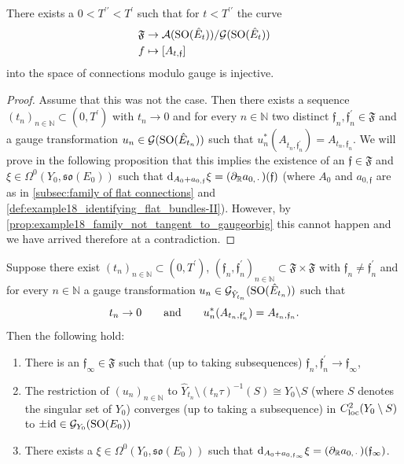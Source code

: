 \documentclass[11pt,a4paper]{scrartcl}
\newcommand*\diff{\mathop{}\!\textup{d}}
\newcommand{\id}{\textup{id}}
\newcommand{\SO}{\textup{SO}}
\numberwithin{equation}{section}
\theoremstyle{plain}
\theoremstyle{definition}
\theoremstyle{remark}
\begin{document}
\begin{proposition}\label{prop:example18-non-gauge-equivalent-instantons}
There exists a $0<T^{\prime\prime}< T^\prime$ such that for $t<T^{\prime\prime}$ the curve 
\begin{align*}
\mathfrak{F} &\to \mathcal{A}(\SO(\hat{E}_t))/\mathcal{G}(\SO(\hat{E}_t)) \\
f &\mapsto [A_{t,\mathfrak{f}}]
\end{align*}
into the space of connections modulo gauge is injective.
\end{proposition}
\begin{proof}
Assume that this was not the case. Then there exists a sequence $(t_n)_{n\in \mathbb{N}} \subset (0,T^\prime)$ with $t_n\to 0$ and for every $n\in \mathbb{N}$ two distinct $\mathfrak{f}_n,\mathfrak{f}_n^\prime \in \mathfrak{F}$ and a gauge transformation $u_n\in \mathcal{G}(\SO(\hat{E}_{t_n}))$ such that $u_n^*(A_{t_n,\mathfrak{f}_n^\prime}) = A_{t_n,\mathfrak{f}_n}$. We will prove in the following proposition that this implies the existence of an $\mathfrak{f} \in \mathfrak{F}$ and $\xi \in \Omega^0(Y_0,\mathfrak{so}(E_0))$ such that $\diff_{A_{0}+a_{0,\mathfrak{f}}} \xi = (\partial_\mathbb{R}a_{0,\, \cdot\, })(\mathfrak{f})$ (where $A_0$ and $a_{0,\mathfrak{f}}$ are as in \autoref{subsec:family of flat connections} and \autoref{def:example18_identifying_flat_bundles-II}). However, by \autoref{prop:example18_family_not_tangent_to_gaugeorbig} this cannot happen and we have arrived therefore at a contradiction.
\end{proof}

\begin{proposition}
Suppose there exist $(t_n)_{n\in \mathbb{N}}\subset (0,T^\prime)$, $(\mathfrak{f}_n,\mathfrak{f}_n^\prime)_{n\in\mathbb{N}}\subset \mathfrak{F}\times \mathfrak{F}$ with $\mathfrak{f}_n \neq \mathfrak{f}_n^\prime$ and for every $n\in \mathbb{N}$ a gauge transformation $u_n \in \mathcal{G}_{\hat{Y}_{t_n}}(\SO(\hat{E}_{t_n}))$ such that \[t_n \to 0 \qquad \textup{and} \qquad u_n^*(A_{t_n,\mathfrak{f}_n^\prime}) = A_{t_n,\mathfrak{f}_n}. \] Then the following hold: 
\begin{enumerate}
\item There is an $\mathfrak{f}_\infty \in \mathfrak{F}$ such that (up to taking subsequences) $\mathfrak{f}_n,\mathfrak{f}_n^\prime \to \mathfrak{f}_\infty$,
\item The restriction of $(u_n)_{n\in \mathbb{N}}$ to $\hat{Y}_{t_n}\setminus (t_n\tau)^{-1}(S) \cong Y_0 \setminus S$ (where $S$ denotes the singular set of $Y_0$) converges (up to taking a subsequence) in $C^2_{\textup{loc}}(Y_0\setminus S)$ to $\pm \id \in \mathcal{G}_{Y_0}(\SO(E_{0}))$
\item There exists a $\xi \in \Omega^0(Y_0,\mathfrak{so}(E_0))$ such that $\diff_{A_{0}+a_{0,\mathfrak{f}_\infty}} \xi = (\partial_{\mathbb{R}} a_{0,\, \cdot} \, )(\mathfrak{f}_\infty)$. 
\end{enumerate}
\end{proposition}
\end{document}
